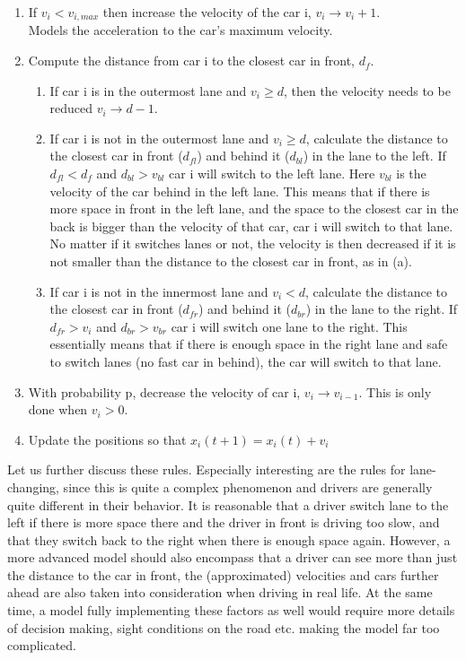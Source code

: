 \documentclass[a4paper,12pt]{article}
\begin{document}
\begin{enumerate}
	\item If $v_i < v_{i, max}$ then increase the velocity of the car i, $v_i \rightarrow v_i+1$.\\
	Models the acceleration to the car's maximum velocity.
	\item Compute the distance from car i to the closest car in front, $d_f$. 
	\begin{enumerate}
		\item If car i is in the outermost lane and $v_i \geq d$, then the velocity needs to be reduced $v_i \rightarrow d-1$. 
		\item If car i is not in the outermost lane and $v_i \geq d$, calculate the distance to the closest car in front ($d_{fl}$) and behind it ($d_{bl}$) in the lane to the left. If $d_{fl}<d_f$ and $d_{bl}>v_{bl}$ car i will switch to the left lane. Here $v_{bl}$ is the velocity of the car behind in the left lane. 
This means that if there is more space in front in the left lane, and the space to the closest car in the back is bigger than the velocity of that car, car i will switch to that lane. No matter if it switches lanes or not, the velocity is then decreased if it is not smaller than the distance to the closest car in front, as in (a). 
		\item If car i is not in the innermost lane and $v_i < d$, calculate the distance to the closest car in front ($d_{fr}$) and behind it ($d_{br}$) in the lane to the right. If $d_{fr}>v_i$ and $d_{br} > v_{br}$ car i will switch one lane to the right. This essentially means that if there is enough space in the right lane and safe to switch lanes (no fast car in behind), the car will switch to that lane.
	\end{enumerate}
	
\item With probability p, decrease the velocity of car i, $v_i \rightarrow v_{i-1}$. This is only done when $v_i>0$. 
\item Update the positions so that $x_i(t+1) = x_i(t) +v_i$
\end{enumerate}

Let us further discuss these rules. Especially interesting are the rules for lane-changing, since this is quite a complex phenomenon and drivers are generally quite different in their behavior. It is reasonable that a driver switch lane to the left if there is more space there and the driver in front is driving too slow, and that they switch back to the right when there is enough space again. However, a more advanced model should also encompass that a driver can see more than just the distance to the car in front, the (approximated) velocities and cars further ahead are also taken into consideration when driving in real life. At the same time, a model fully implementing these factors as well would require more details of  decision making, sight conditions on the road etc. making the model far too complicated.\\
\end{document}
